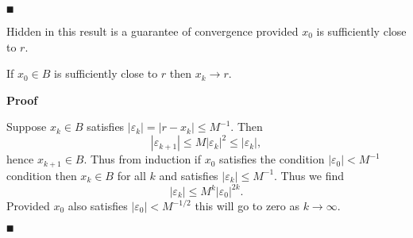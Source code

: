\ensuremath{\QED}

Hidden in this result is a guarantee of convergence provided $x_0$ is sufficiently close to $r$.

\begin{corollary} If $x_0 \ensuremath{\in} B$ is sufficiently close to $r$ then $x_k \ensuremath{\rightarrow} r$.

\end{corollary}
\textbf{Proof}

Suppose $x_k \ensuremath{\in} B$ satisfies $|\ensuremath{\varepsilon}_k| = |r-x_k| \ensuremath{\leq} M^{-1}$. Then
\[
|\ensuremath{\varepsilon}_{k+1}| \ensuremath{\leq} M |\ensuremath{\varepsilon}_k|^2 \ensuremath{\leq} |\ensuremath{\varepsilon}_k|,
\]
hence $x_{k+1} \ensuremath{\in} B$. Thus from induction if $x_0$ satisfies the condition $|\ensuremath{\varepsilon}_0| < M^{-1}$ condition then $x_k \ensuremath{\in} B$ for all $k$ and satisfies $|\ensuremath{\varepsilon}_k| \ensuremath{\leq} M^{-1}$.  Thus we find
\[
|\ensuremath{\varepsilon}_k| \ensuremath{\leq} M^k |\ensuremath{\varepsilon}_0|^{2k}.
\]
Provided $x_0$ also satisfies $|\ensuremath{\varepsilon}_0| < M^{-1/2}$ this will go to zero as $k \ensuremath{\rightarrow} \ensuremath{\infty}$.

\ensuremath{\QED}



